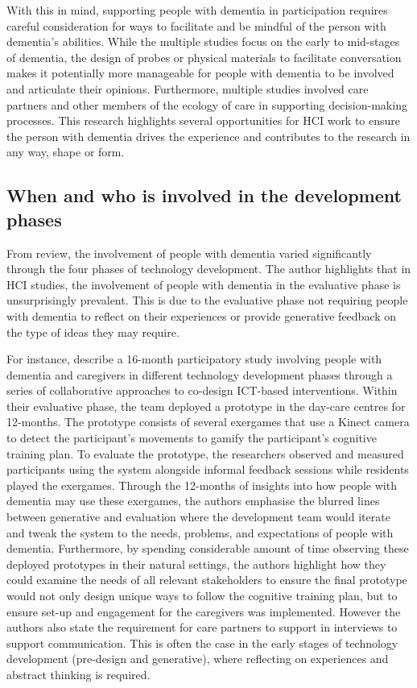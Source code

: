 With this in mind, supporting people with dementia in participation requires careful consideration for ways to facilitate and be mindful of the person with dementia's abilities. While the multiple studies focus on the early to mid-stages of dementia, the design of probes or physical materials to facilitate conversation makes it potentially more manageable for people with dementia to be involved and articulate their opinions. Furthermore, multiple studies involved care partners and other members of the ecology of care in supporting decision-making processes. This research highlights several opportunities for HCI work to ensure the person with dementia drives the experience and contributes to the research in any way, shape or form.

\subsection{When and who is involved in the development phases}
\label{BL:DevelopmentPhases}
From \cite{suijkerbuijk_active_2019} review, the involvement of people with dementia varied significantly through the four phases of technology development. The author highlights that in HCI studies, the involvement of people with dementia in the evaluative phase is unsurprisingly prevalent. This is due to the evaluative phase not requiring people with dementia to reflect on their experiences or provide generative feedback on the type of ideas they may require. 

For instance, \cite{unbehaun_facilitating_2018} describe a 16-month participatory study involving people with dementia and caregivers in different technology development phases through a series of collaborative approaches to co-design ICT-based interventions. Within their evaluative phase, the team deployed a prototype in the day-care centres for 12-months. The prototype consists of several exergames that use a Kinect camera to detect the participant's movements to gamify the participant's cognitive training plan. To evaluate the prototype, the researchers observed and measured participants using the system alongside informal feedback sessions while residents played the exergames. Through the 12-months of insights into how people with dementia may use these exergames, the authors emphasise the blurred lines between generative and evaluation where the development team would iterate and tweak the system to the needs, problems, and expectations of people with dementia. Furthermore, by spending considerable amount of time observing these deployed prototypes in their natural settings, the authors highlight how they could examine the needs of all relevant stakeholders to ensure the final prototype would not only design unique ways to follow the cognitive training plan, but to ensure set-up and engagement for the caregivers was implemented. However the authors also state the requirement for care partners to support in interviews to support communication. This is often the case in the early stages of technology development (pre-design and generative), where reflecting on experiences and abstract thinking is required.

